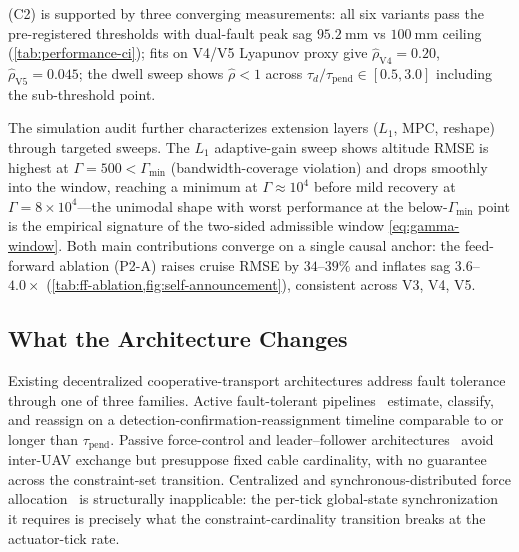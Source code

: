 \documentclass[lettersize,journal]{IEEEtran}
\begin{document}
 (C2) is supported by three converging measurements: all six variants pass the pre-registered thresholds with dual-fault peak sag $\SI{95.2}{\milli\metre}$ vs $\SI{100}{\milli\metre}$ ceiling (\cref{tab:performance-ci}); fits on V4/V5 Lyapunov proxy give $\hat\rho_{\mathrm{V4}}=0.20$, $\hat\rho_{\mathrm{V5}}=0.045$; the dwell sweep shows $\hat\rho < 1$ across $\tau_d/\tau_{\mathrm{pend}}\in[0.5,3.0]$ including the sub-threshold point.

The simulation audit further characterizes extension layers ($L_1$, MPC, reshape) through targeted sweeps. The $L_1$ adaptive-gain sweep shows altitude RMSE is highest at $\Gamma=500 < \Gamma_{\min}$ (bandwidth-coverage violation) and drops smoothly into the window, reaching a minimum at $\Gamma \approx 10^4$ before mild recovery at $\Gamma=8\times10^4$---the unimodal shape with worst performance at the below-$\Gamma_{\min}$ point is the empirical signature of the two-sided admissible window \eqref{eq:gamma-window}. Both main contributions converge on a single causal anchor: the feed-forward ablation (P2-A) raises cruise RMSE by $34$--$39\%$ and inflates sag $3.6$--$4.0\times$ (\cref{tab:ff-ablation,fig:self-announcement}), consistent across V3, V4, V5.

\subsection{What the Architecture Changes}
\label{sec:discussion-advance}

Existing decentralized cooperative-transport architectures address fault tolerance through one of three families. Active fault-tolerant pipelines~\cite{LiuSuspensionFailure2021} estimate, classify, and reassign on a detection-confirmation-reassignment timeline comparable to or longer than $\tau_{\mathrm{pend}}$. Passive force-control and leader--follower architectures~\cite{GassnerPassiveForce2017,NoCommTransport2021} avoid inter-UAV exchange but presuppose fixed cable cardinality, with no guarantee across the constraint-set transition. Centralized and synchronous-distributed force allocation~\cite{Michael2011,WangOng2017,LiLoianno2023,PallarLi2025,SuBhowmick2023} is structurally inapplicable: the per-tick global-state synchronization it requires is precisely what the constraint-cardinality transition breaks at the actuator-tick rate.
\end{document}
